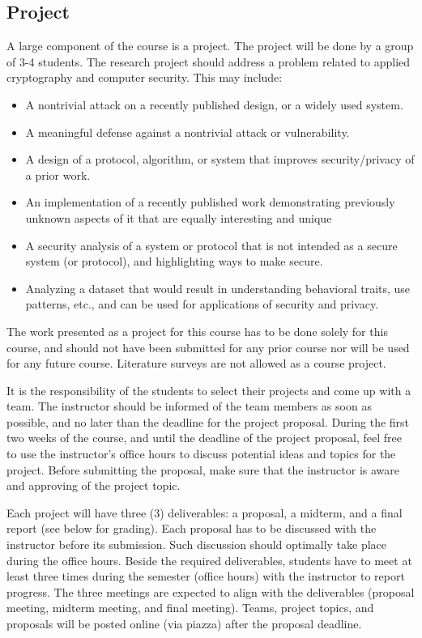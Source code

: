 \documentclass[11pt]{article}
\begin{document}
\subsection{Project}
A large component of the course is a project. The project will be done by a group of 3-4 students. The research project should address a problem related to applied cryptography and computer security. This may include:
\begin{itemize}
\item A nontrivial attack on a recently published design, or a widely used system.
\item A meaningful defense against a nontrivial attack or vulnerability.
\item A design of a protocol, algorithm, or system that improves security/privacy
of a prior work.
\item An implementation of a recently published work demonstrating previously
unknown aspects of it that are equally interesting and unique
\item A security analysis of a system or protocol that is not intended as a secure
system (or protocol), and highlighting ways to make secure.
\item Analyzing a dataset that would result in understanding behavioral traits, use
patterns, etc., and can be used for applications of security and privacy.
\end{itemize}

The work presented as a project for this course has to be done solely for this course, and should not have been submitted for any prior course nor will be used for any future course. Literature surveys are not allowed as a course project.

 It is the responsibility of the students to select their projects and come up with a team. The instructor should be informed of the team members as soon as possible, and no later than the deadline for the project proposal. During the first two weeks of the course, and until the deadline of the project proposal, feel free to use the instructor's office hours to discuss potential ideas and topics for the project. Before submitting the proposal, make sure that the instructor is aware and approving of the project topic. 

 Each project will have three (3) deliverables: a proposal, a midterm, and a final report (see below for grading). Each proposal has to be discussed with the instructor before its submission. Such discussion should optimally take place during the office hours. Beside the required deliverables, students have to meet at least  three times during the semester (office hours) with the instructor to report progress. The three meetings are expected to align with the deliverables (proposal meeting, midterm meeting, and final meeting). Teams, project topics, and proposals will be posted online (via piazza) after the proposal deadline.%
\end{document}
